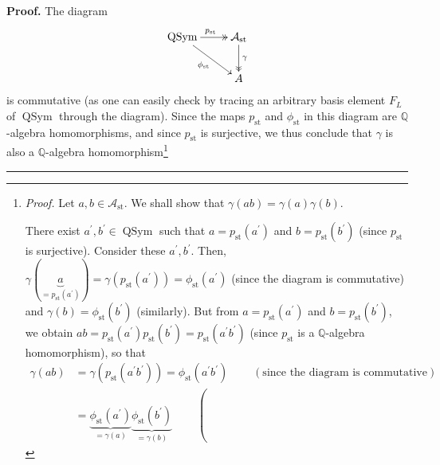 \documentclass[numbers=enddot,12pt,final,onecolumn,notitlepage]{scrartcl}%
\makeatletter
\theoremstyle{definition}
\newenvironment{proof}[1][Proof]{\noindent\textbf{#1.} }{\ \rule{0.5em}{0.5em}}
\newenvironment{verlong}{}{}
\newcommand{\QSym}{\operatorname{QSym}}
\newcommand{\arsurj}{\ar@{->>}}
\makeatother
\begin{document}
\begin{verlong}
\begin{proof}
The diagram%
\[%
\xymatrix{
\QSym\arsurj[r]^{p_{\operatorname{st}}} \ar[dr]_{\phi_{\operatorname{st}}}
& \mathcal{A}_{\operatorname{st}} \arsurj[d]^\gamma\\
& A
}%
\]
is commutative (as one can easily check by tracing an arbitrary basis element
$F_{L}$ of $\operatorname*{QSym}$ through the diagram). Since the maps
$p_{\operatorname*{st}}$ and $\phi_{\operatorname*{st}}$ in this diagram are
$\mathbb{Q}$-algebra homomorphisms, and since $p_{\operatorname*{st}}$ is
surjective, we thus conclude that $\gamma$ is also a $\mathbb{Q}$-algebra
homomorphism\footnote{\textit{Proof.} Let $a,b\in\mathcal{A}%
_{\operatorname*{st}}$. We shall show that $\gamma\left(  ab\right)
=\gamma\left(  a\right)  \gamma\left(  b\right)  $.
\par
There exist $a^{\prime},b^{\prime}\in\operatorname*{QSym}$ such that
$a=p_{\operatorname*{st}}\left(  a^{\prime}\right)  $ and
$b=p_{\operatorname*{st}}\left(  b^{\prime}\right)  $ (since
$p_{\operatorname*{st}}$ is surjective). Consider these $a^{\prime},b^{\prime
}$. Then, $\gamma\left(  \underbrace{a}_{=p_{\operatorname*{st}}\left(
a^{\prime}\right)  }\right)  =\gamma\left(  p_{\operatorname*{st}}\left(
a^{\prime}\right)  \right)  =\phi_{\operatorname*{st}}\left(  a^{\prime
}\right)  $ (since the diagram is commutative) and $\gamma\left(  b\right)
=\phi_{\operatorname*{st}}\left(  b^{\prime}\right)  $ (similarly). But from
$a=p_{\operatorname*{st}}\left(  a^{\prime}\right)  $ and
$b=p_{\operatorname*{st}}\left(  b^{\prime}\right)  $, we obtain
$ab=p_{\operatorname*{st}}\left(  a^{\prime}\right)  p_{\operatorname*{st}%
}\left(  b^{\prime}\right)  =p_{\operatorname*{st}}\left(  a^{\prime}%
b^{\prime}\right)  $ (since $p_{\operatorname*{st}}$ is a $\mathbb{Q}$-algebra
homomorphism), so that%
\begin{align*}
\gamma\left(  ab\right)   &  =\gamma\left(  p_{\operatorname*{st}}\left(
a^{\prime}b^{\prime}\right)  \right)  =\phi_{\operatorname*{st}}\left(
a^{\prime}b^{\prime}\right)  \ \ \ \ \ \ \ \ \ \ \left(  \text{since the
diagram is commutative}\right) \\
&  =\underbrace{\phi_{\operatorname*{st}}\left(  a^{\prime}\right)  }%
_{=\gamma\left(  a\right)  }\underbrace{\phi_{\operatorname*{st}}\left(
b^{\prime}\right)  }_{=\gamma\left(  b\right)  }\ \ \ \ \ \ \ \ \ \ \left(

\end{align*}}
\end{proof}
\end{verlong}
\end{document}
